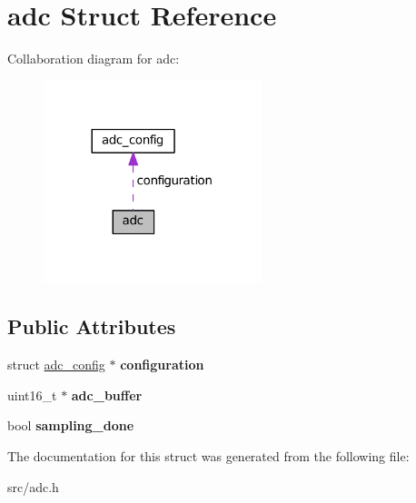 \hypertarget{structadc}{}\section{adc Struct Reference}
\label{structadc}


Collaboration diagram for adc\+:\nopagebreak
\begin{figure}[H]
\begin{center}
\leavevmode
\includegraphics[width=180pt]{structadc__coll__graph}
\end{center}
\end{figure}
\subsection*{Public Attributes}
\begin{DoxyCompactItemize}
\item 
\hypertarget{structadc_aaecb8053d6389a045fd2fd05b3b2f584}{}struct \hyperlink{structadc__config}{adc\+\_\+config} $\ast$ {\bfseries configuration}\label{structadc_aaecb8053d6389a045fd2fd05b3b2f584}

\item 
\hypertarget{structadc_a18f6e4c34b612060add403c39b12c44a}{}uint16\+\_\+t $\ast$ {\bfseries adc\+\_\+buffer}\label{structadc_a18f6e4c34b612060add403c39b12c44a}

\item 
\hypertarget{structadc_a83e9b544b8780ab70e5c193a4b5d8ef8}{}bool {\bfseries sampling\+\_\+done}\label{structadc_a83e9b544b8780ab70e5c193a4b5d8ef8}

\end{DoxyCompactItemize}


The documentation for this struct was generated from the following file\+:\begin{DoxyCompactItemize}
\item 
src/adc.\+h\end{DoxyCompactItemize}
